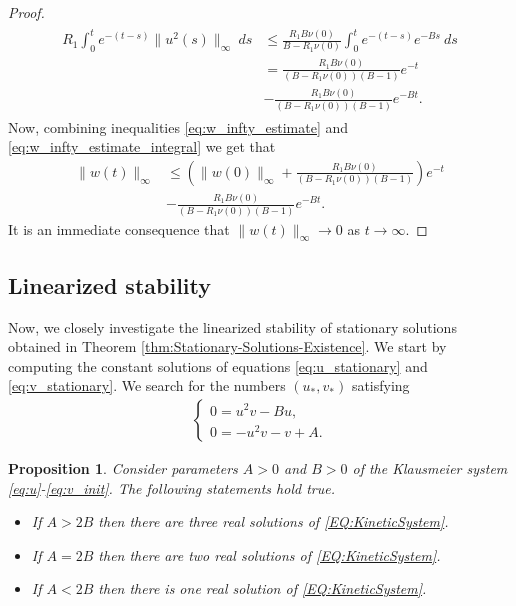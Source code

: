 \documentclass[12pt, a4paper]{article}
\theoremstyle{break}
\theoremstyle{break}
\newtheorem{prp}{Proposition}[section]
\theoremstyle{break}
\theoremstyle{break}
\theoremstyle{break}
\theoremstyle{break}
\theoremstyle{break}
\begin{document}
\begin{proof}
\begin{align}
        \begin{split}
            R_1 \int_0^t e^{-(t-s)} \|u^2(s)\|_\infty \:ds 
            &\leq
            \frac{R_1 B \nu(0)}{B-R_1 \nu(0)} \int_0^t e^{-(t-s)} e^{-Bs}\:ds \\
            &= 
            \frac{R_1 B \nu(0)}{(B-R_1\nu(0))(B-1)} e^{-t} \\
            &- 
            \frac{R_1 B \nu(0)}{(B-R_1\nu(0))(B-1)} e^{-Bt}.
        \end{split}
    \end{align}
    Now, combining inequalities \eqref{eq:w_infty_estimate} and \eqref{eq:w_infty_estimate_integral} we get that
    \begin{align*}
        \|w(t)\|_\infty 
        &\leq \left( \|w(0)\|_\infty + \frac{R_1 B \nu(0)}{(B-R_1\nu(0))(B-1)} \right) e^{-t} \\
        &- \frac{R_1 B \nu(0)}{(B-R_1\nu(0))(B-1)} e^{-Bt}.
    \end{align*}
    It is an immediate consequence that $\|w(t)\|_\infty \rightarrow 0$ as $t \rightarrow \infty$.
\end{proof}

\subsection{Linearized stability}

Now, we closely investigate the linearized stability of stationary solutions obtained in Theorem \ref{thm:Stationary-Solutions-Existence}. We start by computing the constant solutions of equations \eqref{eq:u_stationary} and \eqref{eq:v_stationary}. We search for the numbers $(u_*, v_*)$ satisfying
\begin{align}
    \label{EQ:KineticSystem}
    \begin{cases}
        0 = u^2v - Bu,\\
        0 = -u^2v - v + A.
    \end{cases}
\end{align}
\begin{prp}
    \label{prp:ExistenceOfConstantSSKineticSystem}
    Consider parameters $A > 0$ and $B > 0$ of the Klausmeier system \eqref{eq:u}-\eqref{eq:v_init}. The following statements hold true.
    \begin{itemize}
        \item If $A > 2B$ then there are three real solutions of \eqref{EQ:KineticSystem}.
        \item If $A = 2B$ then there are two real solutions of \eqref{EQ:KineticSystem}.
        \item If $A < 2B$ then there is one real solution of \eqref{EQ:KineticSystem}.
    \end{itemize}
\end{prp}
\end{document}
